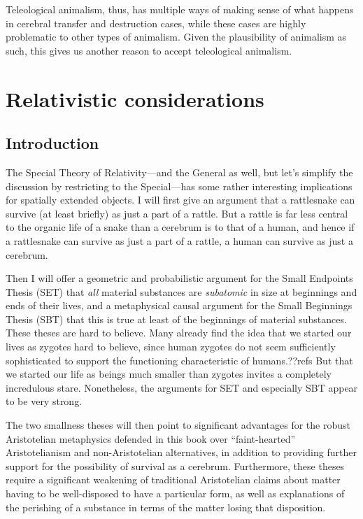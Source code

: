 Teleological animalism, thus, has multiple ways of making sense of what happens in cerebral transfer and destruction cases, while these cases
are highly problematic to other types of animalism. Given the plausibility of animalism as such, this gives us another reason to accept
teleological animalism.

\section{Relativistic considerations}
\subsection{Introduction}
The Special Theory of Relativity---and the General as well, but let's simplify the discussion by restricting to 
the Special---has some rather interesting implications for spatially extended objects. I will first give an argument
that a rattlesnake can survive (at least briefly) as just a part of a rattle. But a rattle is far less central to the organic
life of a snake than a cerebrum is to that of a human, and hence if a rattlesnake can survive as just a part of a rattle, a human
can survive as just a cerebrum. 

Then I will offer a geometric and probabilistic argument for the Small Endpoints Thesis 
(SET) that \textit{all} material substances are \textit{subatomic} in size at beginnings and ends of their lives, 
and a metaphysical causal argument for the Small Beginnings Thesis (SBT) that this is true at least of the 
beginnings of material substances. These theses are hard to believe. Many already find the idea that we started 
our lives as zygotes hard to believe, since human zygotes do not seem sufficiently sophisticated to support the 
functioning characteristic of humans.??refs But that we started our life as beings much smaller than zygotes invites 
a completely incredulous stare. Nonetheless, the arguments for SET and especially SBT appear to be very strong.

The two smallness theses will then point to significant advantages for the robust Aristotelian metaphysics defended 
in this book over ``faint-hearted'' Aristotelianism and non-Aristotelian alternatives, in addition to providing
further support for the possibility of survival as a cerebrum. Furthermore, these theses require a significant 
weakening of traditional Aristotelian claims about matter having to be well-disposed to have a particular form, 
as well as explanations of the perishing of a substance in terms of the matter losing that disposition. 


